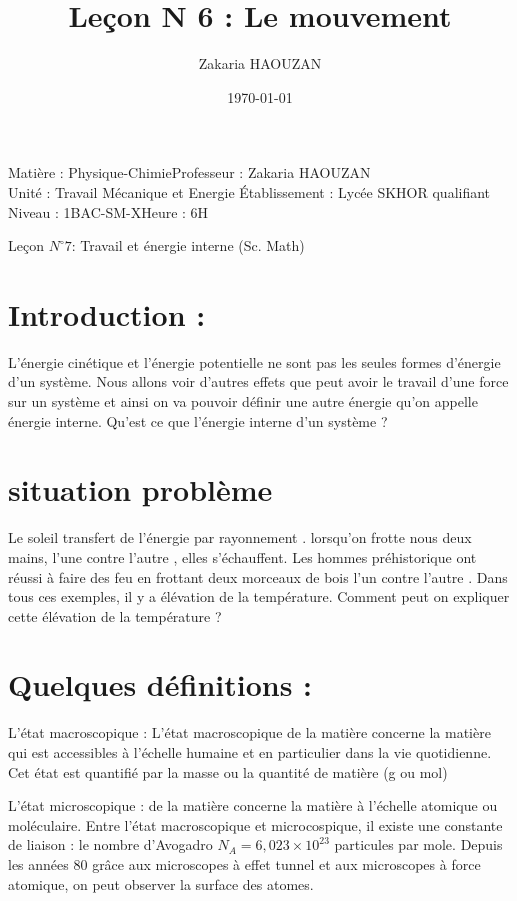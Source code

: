 \documentclass[12pt]{article}
\title{Leçon N 6 : Le mouvement}
\author{Zakaria HAOUZAN}
\date{\today}
\newcommand\headerMe[2]{\noindent{}#1\hfill#2}
\begin{document}
\headerMe{Matière : Physique-Chimie}{Professeur : Zakaria HAOUZAN}\\
\headerMe{Unité : Travail Mécanique et Energie }{Établissement : Lycée SKHOR qualifiant}\\
\headerMe{Niveau : 1BAC-SM-X}{Heure : 6H}\\

\begin{center}

    \Large{Leçon $N^{\circ} 7 $: \color{red} Travail et énergie interne (Sc. Math) }
\end{center}

\section{Introduction : }
L’énergie cinétique et l’énergie potentielle ne sont pas les seules
formes d’énergie d’un système. Nous allons voir d’autres effets que
peut avoir le travail d’une force sur un système et ainsi on va
pouvoir définir une autre énergie qu’on appelle énergie interne.
Qu’est ce que l’énergie interne d’un système ?

\section{situation problème }
Le soleil transfert de l’énergie par rayonnement . lorsqu’on frotte
nous deux mains, l’une contre l’autre , elles s’échauffent. Les
hommes préhistorique ont réussi à faire des feu en frottant deux
morceaux de bois l’un contre l’autre . Dans tous ces exemples, il y
a élévation de la température.
Comment peut on expliquer cette élévation de la
température ?

\section{Quelques définitions : }

L’état macroscopique : 
L’état macroscopique de la matière concerne la matière qui est
accessibles à l’échelle humaine et en particulier dans la vie
quotidienne. Cet état est quantifié par la masse ou la quantité de
matière (g ou mol)

L’état microscopique :  de la matière concerne la matière à l’échelle
atomique ou moléculaire. Entre l’état macroscopique et
microcospique, il existe une constante de liaison : le nombre
d’Avogadro $N_A = 6,023×10^{23}$ particules par mole. Depuis les
années 80 grâce aux microscopes à effet tunnel et aux microscopes
à force atomique, on peut observer la surface des atomes.
\end{document}
